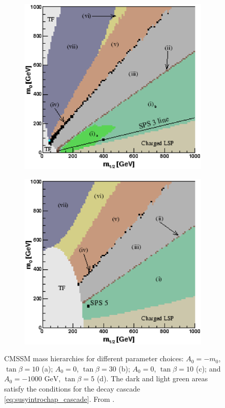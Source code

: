 \documentclass[twoside,english]{uiofysmaster}
\begin{document}
\begin{figure}[hbt]
\begin{subfigure}[b]{0.4\textwidth}
	\includegraphics[width=1\textwidth]{figures/susyintro/scan_sps3.eps}
	\caption{ }
	\label{fig:mSUGRA_decay_spectrum_c}
\end{subfigure}
\begin{subfigure}[b]{0.4\textwidth}
	\includegraphics[width=1\textwidth]{figures/susyintro/scan_sps5.eps}
	\caption{ }
	\label{fig:mSUGRA_decay_spectrum_d}
\end{subfigure}
\caption{CMSSM mass hierarchies for different parameter choices: $A_0 = -m_0$, $\tan\beta = 10$ (a); $A_0 = 0$, $\tan\beta = 30$ (b); $A_0 = 0$, $\tan\beta = 10$ (c); and $A_0 = -1000\,\,\mathrm{GeV}$, $\tan\beta = 5$ (d). The dark and light green areas satisfy the conditions for the decay cascade \eqref{eq:susyintrochap_cascade}. From \cite{Gjelsten:2004ki}.}
\label{fig:mSUGRA_decay_spectrum}
\end{figure}
\end{document}
